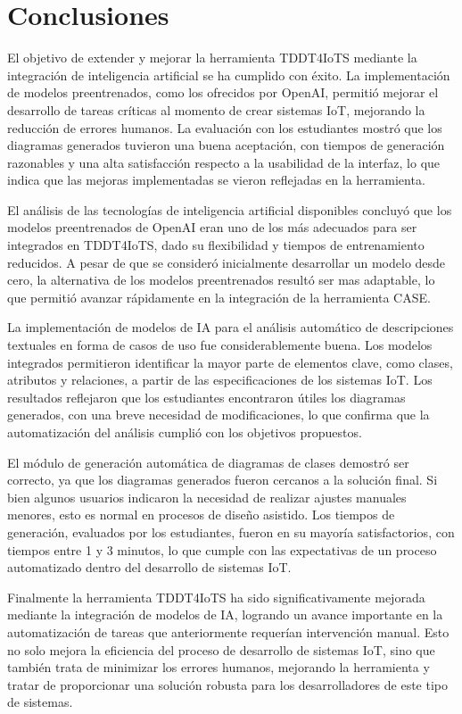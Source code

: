 \chapter{Conclusiones}\label{chapter:conclusiones}

El objetivo de extender y mejorar la herramienta TDDT4IoTS mediante la integración de inteligencia artificial se ha cumplido con éxito. La implementación de modelos preentrenados, como los ofrecidos por OpenAI, permitió mejorar el desarrollo de tareas críticas al momento de crear sistemas IoT, mejorando la reducción de errores humanos. La evaluación con los estudiantes mostró que los diagramas generados tuvieron una buena aceptación, con tiempos de generación razonables y una alta satisfacción respecto a la usabilidad de la interfaz, lo que indica que las mejoras implementadas se vieron reflejadas en la herramienta.

El análisis de las tecnologías de inteligencia artificial disponibles concluyó que los modelos preentrenados de OpenAI eran uno de los más adecuados para ser integrados en TDDT4IoTS, dado su flexibilidad y tiempos de entrenamiento reducidos. A pesar de que se consideró inicialmente desarrollar un modelo desde cero, la alternativa de los modelos preentrenados resultó ser mas adaptable, lo que permitió avanzar rápidamente en la integración de la herramienta CASE.

La implementación de modelos de IA para el análisis automático de descripciones textuales en forma de casos de uso fue considerablemente buena. Los modelos integrados permitieron identificar la mayor parte de elementos clave, como clases, atributos y relaciones, a partir de las especificaciones de los sistemas IoT. Los resultados reflejaron que los estudiantes encontraron útiles los diagramas generados, con una breve necesidad de modificaciones, lo que confirma que la automatización del análisis cumplió con los objetivos propuestos.

El módulo de generación automática de diagramas de clases demostró ser correcto, ya que los diagramas generados fueron cercanos a la solución final. Si bien algunos usuarios indicaron la necesidad de realizar ajustes manuales menores, esto es normal en procesos de diseño asistido. Los tiempos de generación, evaluados por los estudiantes, fueron en su mayoría satisfactorios, con tiempos entre 1 y 3 minutos, lo que cumple con las expectativas de un proceso automatizado dentro del desarrollo de sistemas IoT.

Finalmente la herramienta TDDT4IoTS ha sido significativamente mejorada mediante la integración de modelos de IA, logrando un avance importante en la automatización de tareas que anteriormente requerían intervención manual. Esto no solo mejora la eficiencia del proceso de desarrollo de sistemas IoT, sino que también trata de minimizar los errores humanos, mejorando la herramienta y tratar de proporcionar una solución robusta para los desarrolladores de este tipo de sistemas.